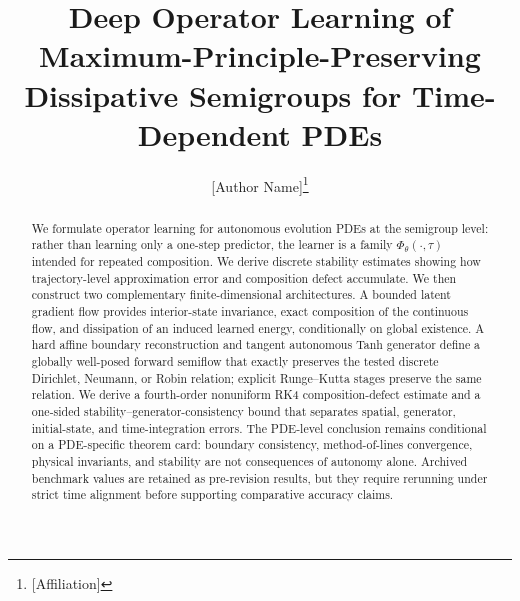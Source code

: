 \documentclass[hidelinks,review,nohypdvips,onefignum,onetabnum]{siamart220329}
\title{Deep Operator Learning of Maximum-Principle-Preserving Dissipative Semigroups for Time-Dependent PDEs}
\author{[Author Name]\thanks{[Affiliation]}}
\date{}
\begin{document}
\maketitle

\begin{abstract}
We formulate operator learning for autonomous evolution PDEs at the semigroup level: rather than learning only a one-step predictor, the learner is a family \(\Phi_{\theta}(\cdot,\tau)\) intended for repeated composition. We derive discrete stability estimates showing how trajectory-level approximation error and composition defect accumulate. We then construct two complementary finite-dimensional architectures. A bounded latent gradient flow provides interior-state invariance, exact composition of the continuous flow, and dissipation of an induced learned energy, conditionally on global existence. A hard affine boundary reconstruction and tangent autonomous Tanh generator define a globally well-posed forward semiflow that exactly preserves the tested discrete Dirichlet, Neumann, or Robin relation; explicit Runge--Kutta stages preserve the same relation. We derive a fourth-order nonuniform RK4 composition-defect estimate and a one-sided stability--generator-consistency bound that separates spatial, generator, initial-state, and time-integration errors. The PDE-level conclusion remains conditional on a PDE-specific theorem card: boundary consistency, method-of-lines convergence, physical invariants, and stability are not consequences of autonomy alone. Archived benchmark values are retained as pre-revision results, but they require rerunning under strict time alignment before supporting comparative accuracy claims.
\end{abstract}
\end{document}

